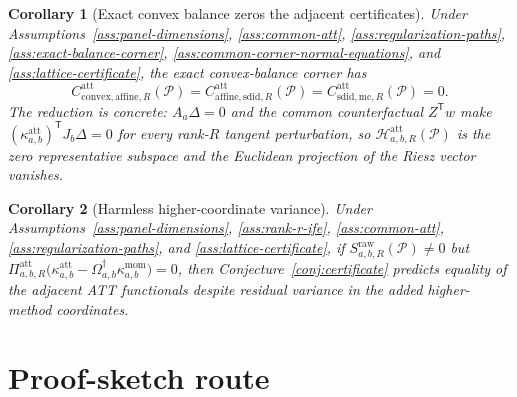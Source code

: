 \documentclass[11pt]{article}
\newcommand{\transpose}{\mathsf{T}}
\newcommand{\calH}{\mathcal{H}}
\theoremstyle{definition}
\theoremstyle{plain}
\newtheorem{corollary}{Corollary}
\theoremstyle{remark}
\begin{document}
\begin{corollary}[Exact convex balance zeros the adjacent certificates]\label{cor:convex-certificate-zero}
Under Assumptions~\ref{ass:panel-dimensions}, \ref{ass:common-att}, \ref{ass:regularization-paths}, \ref{ass:exact-balance-corner}, \ref{ass:common-corner-normal-equations}, and \ref{ass:lattice-certificate}, the exact convex-balance corner has
\[
C^{\mathrm{att}}_{\mathrm{convex},\mathrm{affine},R}(\mathcal P)
=C^{\mathrm{att}}_{\mathrm{affine},\mathrm{sdid},R}(\mathcal P)
=C^{\mathrm{att}}_{\mathrm{sdid},\mathrm{mc},R}(\mathcal P)=0.
\]
The reduction is concrete: \(A_a\Delta=0\) and the common counterfactual \(Z^\transpose w\) make \((\kappa^{\mathrm{att}}_{a,b})^\transpose J_b\Delta=0\) for every rank-\(R\) tangent perturbation, so \(\calH^{\mathrm{att}}_{a,b,R}(\mathcal P)\) is the zero representative subspace and the Euclidean projection of the Riesz vector vanishes.
\end{corollary}

\begin{corollary}[Harmless higher-coordinate variance]\label{cor:harmless-extra-coordinate}
Under Assumptions~\ref{ass:panel-dimensions}, \ref{ass:rank-r-ife}, \ref{ass:common-att}, \ref{ass:regularization-paths}, and \ref{ass:lattice-certificate}, if \(S^{\mathrm{raw}}_{a,b,R}(\mathcal P)\ne0\) but \(\Pi^{\mathrm{att}}_{a,b,R}\bigl(\kappa^{\mathrm{att}}_{a,b}-\Omega_{a,b}^{\dagger}\kappa^{\mathrm{mom}}_{a,b}\bigr)=0\), then Conjecture~\ref{conj:certificate} predicts equality of the adjacent ATT functionals despite residual variance in the added higher-method coordinates.
\end{corollary}

\section{Proof-sketch route}
\end{document}
